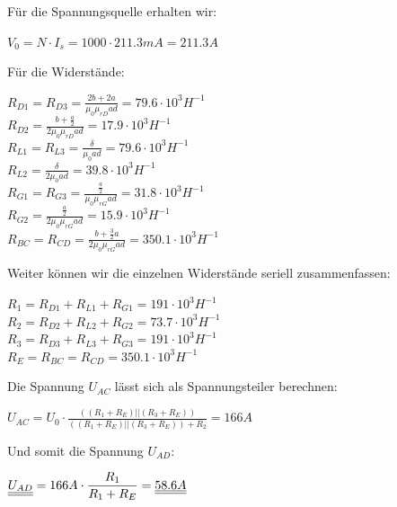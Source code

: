 		Für die Spannungsquelle erhalten wir:
			\begin{center}

				 $V_0 = N \cdot I_s = 1000 \cdot 211.3mA = 211.3A$ \\
			\end{center}
		Für die Widerstände:
			\begin{center}
	 	$R_{D1} = R_{D3} = \frac{2b + 2a}{\mu_0 \mu_{rD} a d} = 79.6 \cdot 10^3H^{-1}$ \\
	 	$R_{D2} = \frac{b + \frac{a}{2} }{2 \mu_0 \mu_{rD} a d} = 17.9 \cdot 10^3H^{-1}$ \\

	 	$R_{L1} = R_{L3} = \frac{\delta}{\mu_0 a d} = 79.6 \cdot 10^3H^{-1}$ \\
		$R_{L2} =  \frac{\delta}{2\mu_0 a d} = 39.8 \cdot 10^3 H^{-1}$\\
		$R_{G1} = R_{G3} = \frac{\frac{a}{2}}{\mu_0\mu_{rG}ad} = 31.8 \cdot 10^3H^{-1}$ \\
		$R_{G2} =\frac{\frac{a}{2}}{2\mu_0\mu_{rG}ad} = 15.9 \cdot 10^3H^{-1}$ \\
		$R_{BC} = R_{CD} = \frac{b + \frac{3}{2}a}{2\mu_0\mu_{rG}ad} = 350.1\cdot 10^3H^{-1}$ \\
				\end{center}
		Weiter können wir die einzelnen Widerstände seriell zusammenfassen:
			\begin{center}
		$R_1 = R_{D1} + R_{L1} + R_{G1} = 191 \cdot 10^3 H^{-1}$ \\
		$R_2 = R_{D2} + R_{L2} + R_{G2} = 73.7 \cdot 10^3 H^{-1}$ \\
		$R_3 = R_{D3} + R_{L3} + R_{G3} = 191 \cdot 10^3 H^{-1}$ \\
		$R_E = R_{BC} = R_ {CD} = 350.1 \cdot 10^3 H^{-1} $ \\
					\end{center}

		Die Spannung $U_{AC}$ lässt sich als Spannungsteiler berechnen:

			\begin{center}
		$\displaystyle U_{AC} = U_0 \cdot \frac{((R_1 + R_E) || (R_3 + R_E)) } { ((R_1 + R_E) || (R_3 + R_E)) + R_2} = 166A$ \\
				\end{center}
		Und somit die Spannung $ U_{AD}$:
		\begin{center}
			$\displaystyle \underline{\underline{U_{AD}}} = 166A \cdot \frac{R_1}{R_1 + R_E} = \underline{\underline{58.6A}}$
		\end{center}
		\iend

